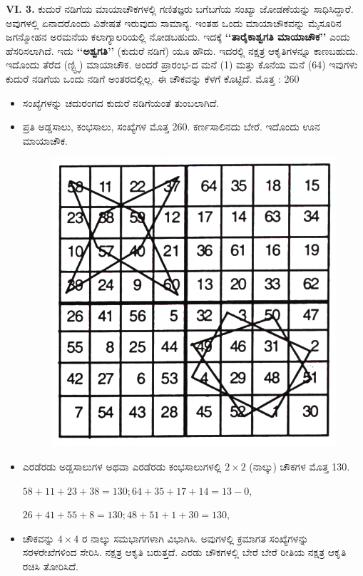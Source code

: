 \textbf{VI. 3.} ಕುದುರೆ ನಡಿಗೆಯ ಮಾಯಾಚೌಕಗಳಲ್ಲಿ ಗಣಿತಜ್ಞರು ಬಗೆಬಗೆಯ ಸಂಖ್ಯಾ ಜೋಡಣೆಯನ್ನು ಸಾಧಿಸಿದ್ದಾರೆ. ಅವುಗಳಲ್ಲಿ ಏನಾದರೊಂದು ವಿಶೇಷತೆ ಇರುವುದು ಸಾಮಾನ್ಯ. ಇಂತಹ ಒಂದು ಮಾಯಾಚೌಕವನ್ನು ಮೈಸೂರಿನ ಜಗನ್ಮೋಹನ ಅರಮನೆಯ ಕಲಾಗ್ಯಾಲರಿಯಲ್ಲಿ ನೋಡಬಹುದು. ಇದಕ್ಕೆ  \textbf{‘‘ತಾರೈಕಾಶ್ವಗತಿ ಮಾಯಾಚೌಕ’’} ಎಂದು ಹೆಸರಿಸಲಾಗಿದೆ. ಇದು \textbf{‘‘ಅಶ್ವಗತಿ’’} (ಕುದುರೆ ನಡಿಗೆ) ಯೂ ಹೌದು. ಇದರಲ್ಲಿ ನಕ್ಷತ್ರ ಆಕೃತಿಗಳನ್ನೂ ಕಾಣಬಹುದು. ಇದೊಂದು ತೆರೆದ (ಣ್ಟ್ಛ್ಞಿ) ಮಾಯಾಚೌಕ. ಅಂದರೆ ಪ್ರಾರಂಭ-ದ ಮನೆ (1) ಮತ್ತು ಕೊನೆಯ ಮನೆ (64) ಇವುಗಳು ಕುದುರೆ ನಡಿಗೆಯ ಒಂದು ನಡಿಗೆ ಅಂತರದಲ್ಲಿಲ್ಲ. ಈ ಚೌಕವನ್ನು ಕೆಳಗೆ ಕೊಟ್ಟಿದೆ. ಮೊತ್ತ : 260
\begin{itemize}
	\item ಸಂಖ್ಯೆಗಳನ್ನು ಚದುರಂಗದ ಕುದುರೆ ನಡಿಗೆಯಂತೆ ತುಂಬಲಾಗಿದೆ.
	\item ಪ್ರತಿ ಅಡ್ಡಸಾಲು, ಕಂಭಸಾಲು, ಸಂಖ್ಯೆಗಳ ಮೊತ್ತ 260. ಕರ್ಣಸಾಲಿನದು ಬೇರೆ. ಇದೊಂದು ಊನ ಮಾಯಾಚೌಕ.
	\begin{figure}[H]
	\includegraphics{src/figures/chap6/fig6.4.jpg}
	\end{figure}
	\item ಎರಡೆರಡು ಅಡ್ಡಸಾಲುಗಳ ಅಥವಾ ಎರಡೆರಡು ಕಂಭಸಾಲುಗಳಲ್ಲಿ $2 \times 2$ (ನಾಲ್ಕು) ಚೌಕಗಳ ಮೊತ್ತ 130.

	$58+11+23+38=130; 64+35+17+14=13-0,$

	$26+41+55+8= 130; 48+51+1+30=130,$
	\item ಚೌಕವನ್ನು $4 \times 4$ ರ ನಾಲ್ಕು ಸಮಭಾಗಗಳಾಗಿ ವಿಭಾಗಿಸಿ. ಅವುಗಳಲ್ಲಿ ಕ್ರಮಾಗತ ಸಂಖ್ಯೆಗಳನ್ನು ಸರಳರೇಖೆಗಳಿಂದ ಸೇರಿಸಿ. ನಕ್ಷತ್ರ ಆಕೃತಿ ಬರುತ್ತದೆ. ಎರಡು ಚೌಕಗಳಲ್ಲಿ ಬೇರೆ ಬೇರೆ ರೀತಿಯ ನಕ್ಷತ್ರ ಆಕೃತಿ ರಚಿಸಿ ತೋರಿಸಿದೆ.
\end{itemize}

